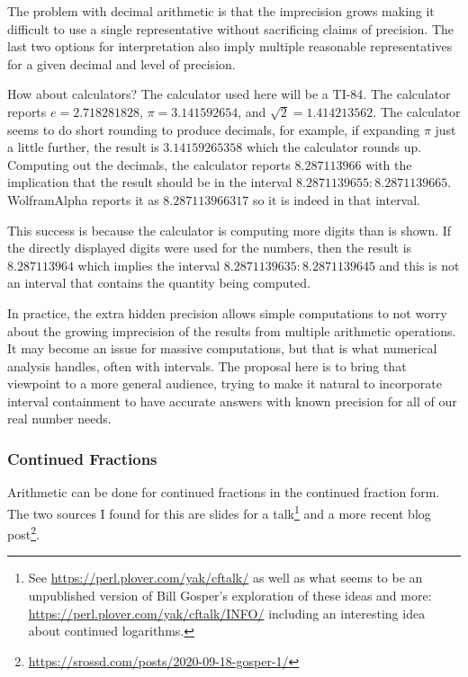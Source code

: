 \documentclass[12pt]{article}
\begin{document}
The problem with decimal arithmetic is that the imprecision grows making it difficult to use a single representative without sacrificing claims of precision. The last two options for interpretation also imply multiple reasonable representatives for a given decimal and level of precision. 

How about calculators? The calculator used here will be a TI-84. The calculator reports  $e = 2.718281828$, $\pi = 3.141592654$, and $\sqrt{2} = 1.414213562$. The calculator seems to do short rounding to produce decimals, for example, if expanding $\pi $ just a little further, the result is  $3.14159265358$ which the calculator rounds up. Computing out the decimals, the calculator reports $8.287113966$ with the implication that the result should be in the interval $8.2871139655:8.2871139665$.  WolframAlpha reports it as $8.287113966317$ so it is indeed in that interval. 

This success is because the calculator is computing more digits than is shown. If the directly displayed digits were used for the numbers, then the result is $8.287113964$ which implies the interval $8.2871139635:8.2871139645$ and this is not an interval that contains the quantity being computed. 

In practice, the extra hidden precision allows simple computations to not worry about the growing imprecision of the results from multiple arithmetic operations. It may become an issue for massive computations, but that is what numerical analysis handles, often with intervals. The proposal here is to bring that viewpoint to a more general audience, trying to make it natural to incorporate interval containment to have accurate answers with known precision for all of our real number needs. 


\subsubsection{Continued Fractions}\label{sec:con-frac}

Arithmetic can be done for continued fractions in the continued fraction form. The two sources I found for this are slides for a talk\footnote{See \url{https://perl.plover.com/yak/cftalk/} as well as what seems to be an unpublished version of Bill Gosper's exploration of these ideas and more: \url{https://perl.plover.com/yak/cftalk/INFO/} including an interesting idea about continued logarithms.} and a more recent blog post\footnote{\url{https://srossd.com/posts/2020-09-18-gosper-1/}}. 
\end{document}
